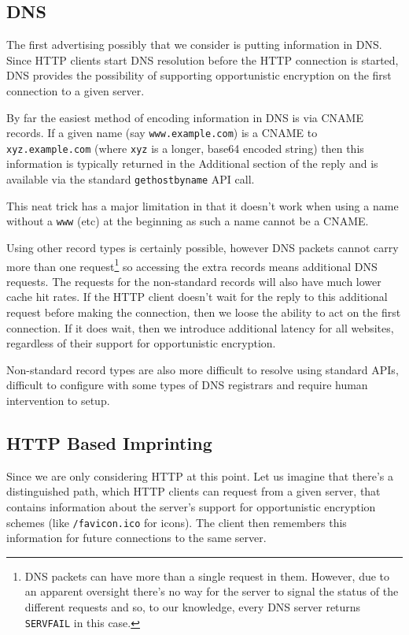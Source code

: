 \documentclass[conference]{IEEEtran}
\begin{document}
\subsection{DNS}

The first advertising possibly that we consider is putting information in DNS.
Since HTTP clients start DNS resolution before the HTTP connection is started,
DNS provides the possibility of supporting opportunistic encryption on the
first connection to a given server.

By far the easiest method of encoding information in DNS is via CNAME records.
If a given name (say {\tt www.example.com}) is a CNAME to {\tt xyz.example.com}
(where {\tt xyz} is a longer, base64 encoded string) then this information is
typically returned in the Additional section of the reply\cite{rfc1035} and is
available via the standard {\tt gethostbyname} API call.

This neat trick has a major limitation in that it doesn't work when using a
name without a {\tt www} (etc) at the beginning as such a name cannot be a
CNAME.

Using other record types is certainly possible, however DNS packets cannot
carry more than one request\footnote{DNS packets can have more than a single
request in them. However, due to an apparent oversight there's no way for the
server to signal the status of the different requests and so, to our knowledge,
every DNS server returns {\tt SERVFAIL} in this case.} so accessing the extra
records means additional DNS requests. The requests for the non-standard
records will also have much lower cache hit rates. If the HTTP client doesn't
wait for the reply to this additional request before making the connection,
then we loose the ability to act on the first connection. If it does wait, then
we introduce additional latency for all websites, regardless of their support
for opportunistic encryption.

Non-standard record types are also more difficult to resolve using standard
APIs, difficult to configure with some types of DNS registrars and require human
intervention to setup.

\subsection{HTTP Based Imprinting}

Since we are only considering HTTP at this point. Let us imagine that there's a
distinguished path, which HTTP clients can request from a given server, that
contains information about the server's support for opportunistic encryption
schemes (like {\tt /favicon.ico} for icons). The client then remembers this
information for future connections to the same server.
\end{document}
